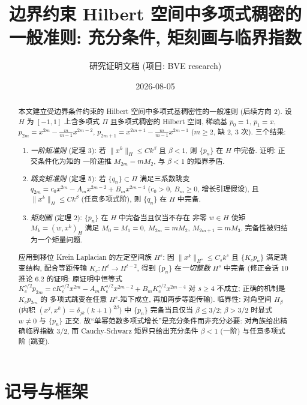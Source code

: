 \documentclass[UTF8]{ctexart}
\title{边界约束 Hilbert 空间中多项式稠密的一般准则: 充分条件, 矩刻画与临界指数}
\author{研究证明文档 (项目: BVE research)}
\date{2026-08-05}
\begin{document}
\maketitle

\begin{abstract}
本文建立受边界条件约束的 Hilbert 空间中多项式基稠密性的一般准则 (后续方向 2).
设 $H$ 为 $[-1,1]$ 上含多项式 $\Pi$ 且多项式稠密的 Hilbert 空间, 稀疏基
$p_0 = 1$, $p_1 = x$, $p_{2m} = x^{2m} - \frac{m}{m-1}x^{2m-2}$,
$p_{2m+1} = x^{2m+1} - \frac{m}{m-1}x^{2m-1}$ ($m \geq 2$, 缺 2, 3 次). 三个结果:
\begin{enumerate}
	\item \emph{一阶矩准则} (定理 3): 若 $\|x^k\|_H \leq C k^\beta$ 且
		$\beta < 1$, 则 $\{p_n\}$ 在 $H$ 中完备. 证明: 正交条件化为矩的
		一阶递推 $M_{2m} = mM_2$, 与 $\beta < 1$ 的矩界矛盾.
	\item \emph{跳变矩准则} (定理 5): 若 $\{q_n\} \subset \Pi$ 满足三系数跳变
		$q_{2m} = c_0 x^{2m} - A_m x^{2m-2} + B_m x^{2m-4}$ ($c_0 > 0$,
		$B_m \geq 0$, 增长引理假设), 且 $\|x^k\|_H \leq Ck^\beta$ (任意多项式阶),
		则 $\{q_n\}$ 在 $H$ 中完备.
	\item \emph{矩刻画} (定理 2): $\{p_n\}$ 在 $H$ 中完备当且仅当不存在
		非零 $w \in H$ 使矩 $M_k = (w, x^k)_H$ 满足 $M_0 = M_1 = 0$,
		$M_{2m} = mM_2$, $M_{2m+1} = mM_3$. 完备性被归结为一个矩量问题.
\end{enumerate}
应用到移位 Krein Laplacian 的左定空间族 $H^s$: 因 $\|x^k\|_{H^s} \leq C_s k^s$
且 $\{K_c p_n\}$ 满足跳变结构, 配合等距传输 $K_c: H^{t} \to H^{t-2}$,
得到 $\{p_n\}$ 在\emph{一切整数} $H^s$ 中完备 (修正会话 10 推论 6.2 的证明:
原证明中恒等式 $K_c^{s/2}p_{2m} = cK_c^{s/2}x^{2m} - A_mK_c^{s/2}x^{2m-2}
+ B_mK_c^{s/2}x^{2m-4}$ 对 $s \geq 4$ 不成立; 正确的机制是 $K_c p_{2m}$ 的
多项式跳变在任意 $H^s$-矩下成立, 再加两步等距传输). 临界性: 对角空间
$H_\beta$ (内积 $(x^j, x^k) = \delta_{jk}(k+1)^{2\beta}$) 中 $\{p_n\}$
完备当且仅当 $\beta \leq 3/2$; $\beta > 3/2$ 时显式 $w \neq 0$ 与
$\{p_n\}$ 正交. 故``单幂范数多项式增长''是充分条件而非充分必要:
对角族给出精确临界指数 $3/2$, 而 Cauchy-Schwarz 矩界只给出充分条件
$\beta < 1$ (一阶) 与任意多项式阶 (跳变).
\end{abstract}

\tableofcontents

\section{记号与框架}
\end{document}
